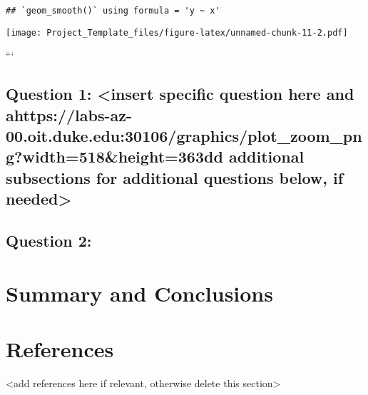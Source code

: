 \documentclass[
]{article}
\begin{document}
\begin{verbatim}
## `geom_smooth()` using formula = 'y ~ x'
\end{verbatim}

\texttt{[image: Project\_Template\_files/figure-latex/unnamed-chunk-11-2.pdf]}

```

\subsection{Question 1: \textless insert specific question here and
ahttps://labs-az-00.oit.duke.edu:30106/graphics/plot\_zoom\_png?width=518\&height=363dd
additional subsections for additional questions below, if
needed\textgreater{}}\label{question-1-insert-specific-question-here-and-ahttpslabs-az-00.oit.duke.edu30106graphicsplot_zoom_pngwidth518height363dd-additional-subsections-for-additional-questions-below-if-needed}

\subsection{Question 2:}\label{question-2}

\newpage

\section{Summary and Conclusions}\label{summary-and-conclusions}

\newpage

\section{References}\label{references}

\textless add references here if relevant, otherwise delete this
section\textgreater{}
\end{document}
